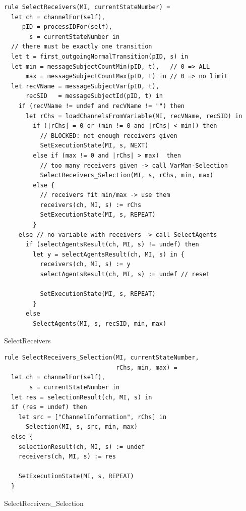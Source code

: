 \begin{listing}[H]
\begin{verbatim}
rule SelectReceivers(MI, currentStateNumber) =
  let ch = channelFor(self),
     pID = processIDFor(self),
       s = currentStateNumber in
  // there must be exactly one transition
  let t = first_outgoingNormalTransition(pID, s) in
  let min = messageSubjectCountMin(pID, t),   // 0 => ALL
      max = messageSubjectCountMax(pID, t) in // 0 => no limit
  let recVName = messageSubjectVar(pID, t),
      recSID   = messageSubjectId(pID, t) in
    if (recVName != undef and recVName != "") then
      let rChs = loadChannelsFromVariable(MI, recVName, recSID) in
        if (|rChs| = 0 or (min != 0 and |rChs| < min)) then
          // BLOCKED: not enough receivers given
          SetExecutionState(MI, s, NEXT)
        else if (max != 0 and |rChs| > max)  then
          // too many receivers given -> call VarMan-Selection
          SelectReceivers_Selection(MI, s, rChs, min, max)
        else {
          // receivers fit min/max -> use them
          receivers(ch, MI, s) := rChs
          SetExecutionState(MI, s, REPEAT)
        }
    else // no variable with receivers -> call SelectAgents
      if (selectAgentsResult(ch, MI, s) != undef) then
        let y = selectAgentsResult(ch, MI, s) in {
          receivers(ch, MI, s) := y
          selectAgentsResult(ch, MI, s) := undef // reset

          SetExecutionState(MI, s, REPEAT)
        }
      else
        SelectAgents(MI, s, recSID, min, max)
\end{verbatim}
\caption{SelectReceivers}
\label{lst:asm:SelectReceivers}
\end{listing}




\begin{listing}[H]
\begin{verbatim}
rule SelectReceivers_Selection(MI, currentStateNumber,
                               rChs, min, max) =
  let ch = channelFor(self),
       s = currentStateNumber in
  let res = selectionResult(ch, MI, s) in
  if (res = undef) then
    let src = ["ChannelInformation", rChs] in
      Selection(MI, s, src, min, max)
  else {
    selectionResult(ch, MI, s) := undef
    receivers(ch, MI, s) := res

    SetExecutionState(MI, s, REPEAT)
  }
\end{verbatim}
\caption{SelectReceivers\_Selection}
\label{lst:asm:SelectReceivers_Selection}
\end{listing}




